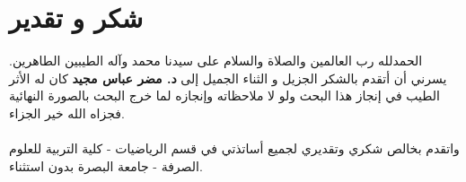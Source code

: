 \chapter*{شكر و تقدير}

الحمدلله رب العالمين والصلاة والسلام على سيدنا محمد وآله الطيبين الطاهرين. يسرني أن أتقدم بالشكر الجزيل و الثناء الجميل إلى \textbf{د. مضر عباس مجيد} كان له الأثر الطيب في إنجاز هذا البحث ولو لا ملاحظاته وإنجازه لما خرج البحث بالصورة النهائية فجزاه الله خير الجزاء.\\
\\
واتقدم بخالص شكري وتقديري لجميع أساتذتي في قسم الرياضيات - كلية التربية للعلوم الصرفة - جامعة البصرة بدون استثناء.
